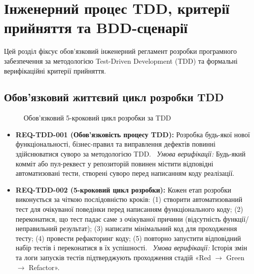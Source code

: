 \section{Інженерний процес TDD, критерії прийняття та BDD-сценарії}\label{sec:tdd}

Цей розділ фіксує обов'язковий інженерний регламент розробки програмного забезпечення за методологією Test-Driven Development (TDD) та формальні верифікаційні критерії прийняття.

\subsection{Обов'язковий життєвий цикл розробки TDD}\label{sec:tdd-process}

\begin{figure}[htbp]
\centering
{}
\caption{Обов'язковий 5-кроковий цикл розробки за TDD}\label{fig:tdd-cycle}
\end{figure}

\begin{itemize}[leftmargin=*,labelindent=0pt]
    \item \textbf{REQ-TDD-001 (Обов'язковість процесу TDD):} Розробка будь-якої нової функціональності, бізнес-правил та виправлення дефектів повинні здійснюватися суворо за методологією TDD.~
    \textit{Умова верифікації:} Будь-який комміт або пул-реквест у репозиторій повинен містити відповідні автоматизовані тести, створені суворо перед написанням коду реалізації.

    \item \textbf{REQ-TDD-002 (5-кроковий цикл розробки):} Кожен етап розробки виконується за чіткою послідовністю кроків: (1) створити автоматизований тест для очікуваної поведінки перед написанням функціонального коду; (2) переконатися, що тест падає саме з очікуваної причини (відсутність функції/неправильний результат); (3) написати мінімальний код для проходження тесту; (4) провести рефакторинг коду; (5) повторно запустити відповідний набір тестів і переконатися в їх успішності.~
    \textit{Умова верифікації:} Історія змін та логи запусків тестів підтверджують проходження стадій «Red $\rightarrow$ Green $\rightarrow$ Refactor».
\end{itemize}

